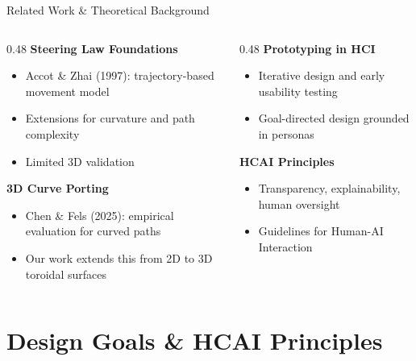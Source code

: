 \documentclass[aspectratio=169, 10pt]{beamer}
\begin{document}
\begin{frame}{Related Work \& Theoretical Background}
  \begin{columns}[T]
    \begin{column}{0.48\textwidth}
      \textbf{Steering Law Foundations}
      \begin{itemize}
        \item Accot \& Zhai (1997): trajectory-based movement model \cite{accot1997beyond}
        \item Extensions for curvature and path complexity
        \item Limited 3D validation \cite{liu2011revisiting}
      \end{itemize}

      \vspace{0.6em}
      \textbf{3D Curve Porting}
      \begin{itemize}
        \item Chen \& Fels (2025): empirical evaluation for curved paths \cite{chen2025curves}
        \item Our work extends this from 2D to 3D toroidal surfaces
      \end{itemize}
    \end{column}
    \begin{column}{0.48\textwidth}
      \textbf{Prototyping in HCI}
      \begin{itemize}
        \item Iterative design and early usability testing \cite{sharp2019interaction}
        \item Goal-directed design grounded in personas \cite{cooper2014aboutface}
      \end{itemize}

      \vspace{0.6em}
      \textbf{HCAI Principles}
      \begin{itemize}
        \item Transparency, explainability, human oversight \cite{shneiderman2022hcai}
        \item Guidelines for Human-AI Interaction \cite{amershi2019guidelines}
      \end{itemize}
    \end{column}
  \end{columns}
\end{frame}

\section{Design Goals \& HCAI Principles}
\end{document}
